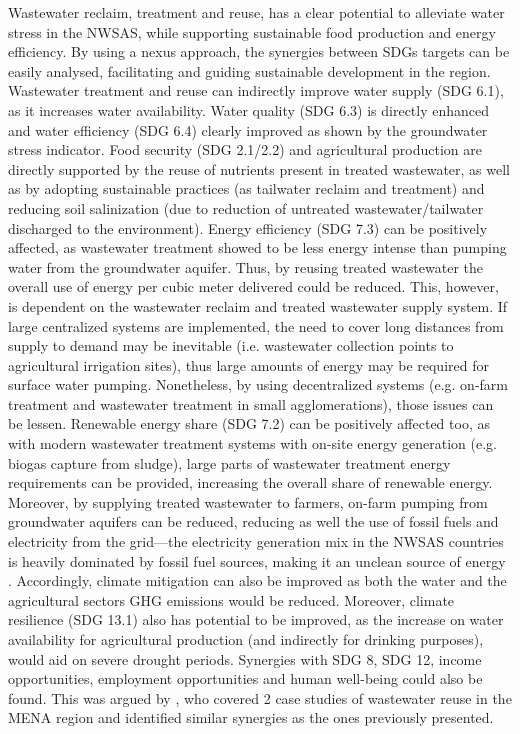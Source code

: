 Wastewater reclaim, treatment and reuse, has a clear potential to alleviate water stress in the NWSAS, while supporting sustainable food production and energy efficiency. By using a nexus approach, the synergies between SDGs targets can be easily analysed, facilitating and guiding sustainable development in the region. Wastewater treatment and reuse can indirectly improve water supply (SDG 6.1), as it increases water availability. Water quality (SDG 6.3) is directly enhanced and water efficiency (SDG 6.4) clearly improved as shown by the groundwater stress indicator. Food security (SDG 2.1/2.2) and agricultural production are directly supported by the reuse of nutrients present in treated wastewater, as well as by adopting sustainable practices (as tailwater reclaim and treatment) and reducing soil salinization (due to reduction of untreated wastewater/tailwater discharged to the environment). Energy efficiency (SDG 7.3) can be positively affected, as wastewater treatment showed to be less energy intense than pumping water from the groundwater aquifer. Thus, by reusing treated wastewater the overall use of energy per cubic meter delivered could be reduced. This, however, is dependent on the wastewater reclaim and treated wastewater supply system. If large centralized systems are implemented, the need to cover long distances from supply to demand may be inevitable (i.e. wastewater collection points to agricultural irrigation sites), thus large amounts of energy may be required for surface water pumping. Nonetheless, by using decentralized systems (e.g. on-farm treatment and wastewater treatment in small agglomerations), those issues can be lessen. Renewable energy share (SDG 7.2) can be positively affected too, as with modern wastewater treatment systems with on-site energy generation (e.g. biogas capture from sludge), large parts of wastewater treatment energy requirements can be provided, increasing the overall share of renewable energy. Moreover, by supplying treated wastewater to farmers, on-farm pumping from groundwater aquifers can be reduced, reducing as well the use of fossil fuels and electricity from the grid---the electricity generation mix in the NWSAS countries is heavily dominated by fossil fuel sources, making it an unclean source of energy \cite{AlgeriaElectricityHeat2016,LibyaElectricityHeat2016,TunisiaElectricityHeat2016}. Accordingly, climate mitigation can also be improved as both the water and the agricultural sectors GHG emissions would be reduced. Moreover, climate resilience (SDG 13.1) also has potential to be improved, as the increase on water availability for agricultural production (and indirectly for drinking purposes), would aid on severe drought periods. Synergies with SDG 8, SDG 12, income opportunities, employment opportunities and human well-being could also be found. This was argued by \citet{hoffNexusApproachMENA2019}, who covered 2 case studies of wastewater reuse in the MENA region and identified similar synergies as the ones previously presented.

